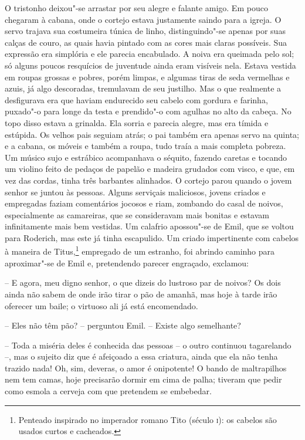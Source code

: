 O tristonho deixou"-se arrastar por seu alegre e falante amigo. Em pouco
chegaram à cabana, onde o cortejo estava justamente saindo para a
igreja. O servo trajava sua costumeira túnica de linho, distinguindo"-se
apenas por suas calças de couro, as quais havia pintado com as cores
mais claras possíveis. Sua expressão era simplória e ele parecia
encabulado. A noiva era queimada pelo sol; só alguns poucos resquícios
de juventude ainda eram visíveis nela. Estava vestida em roupas grossas
e pobres, porém limpas, e algumas tiras de seda vermelhas e azuis, já
algo descoradas, tremulavam de seu justilho. Mas o que realmente a
desfigurava era que haviam endurecido seu cabelo com gordura e farinha,
puxado"-o para longe da testa e prendido"-o com agulhas no alto da
cabeça. No topo disso estava a grinalda. Ela sorria e parecia alegre,
mas era tímida e estúpida. Os velhos pais seguiam atrás; o pai também
era apenas servo na quinta; e a cabana, os móveis e também a roupa,
tudo traía a mais completa pobreza. Um músico sujo e estrábico
acompanhava o séquito, fazendo caretas e tocando um violino feito de
pedaços de papelão e madeira grudados com visco, e que, em vez das
cordas, tinha três barbantes alinhados. O cortejo parou quando o jovem
senhor se juntou às pessoas. Alguns serviçais maliciosos, jovens
criados e empregadas faziam comentários jocosos e riam, zombando do
casal de noivos, especialmente as camareiras, que se consideravam mais
bonitas e estavam infinitamente mais bem vestidas. Um calafrio apossou"-se
de Emil, que se voltou para Roderich, mas este já tinha escapulido. Um
criado impertinente com cabelos à maneira de Titus,\footnote{ Penteado inspirado
no imperador romano Tito (século \textsc{i}): os cabelos são usados curtos
e cacheados.} empregado de um estranho, foi abrindo caminho para
aproximar"-se de Emil e, pretendendo parecer engraçado, exclamou:

-- E agora, meu digno senhor, o que dizeis do lustroso par de
noivos? Os dois ainda não sabem de onde irão tirar o pão de amanhã, mas
hoje à tarde irão oferecer um baile; o virtuoso ali já está encomendado.

-- Eles não têm pão? -- perguntou Emil. -- Existe algo semelhante?

-- Toda a miséria deles é conhecida das pessoas -- o outro continuou
tagarelando --, mas o sujeito diz que é afeiçoado a essa criatura, ainda
que ela não tenha trazido nada! Oh, sim, deveras, o amor é onipotente!
O bando de maltrapilhos nem tem camas, hoje precisarão dormir em cima
de palha; tiveram que pedir como esmola a cerveja com que pretendem se
embebedar.

